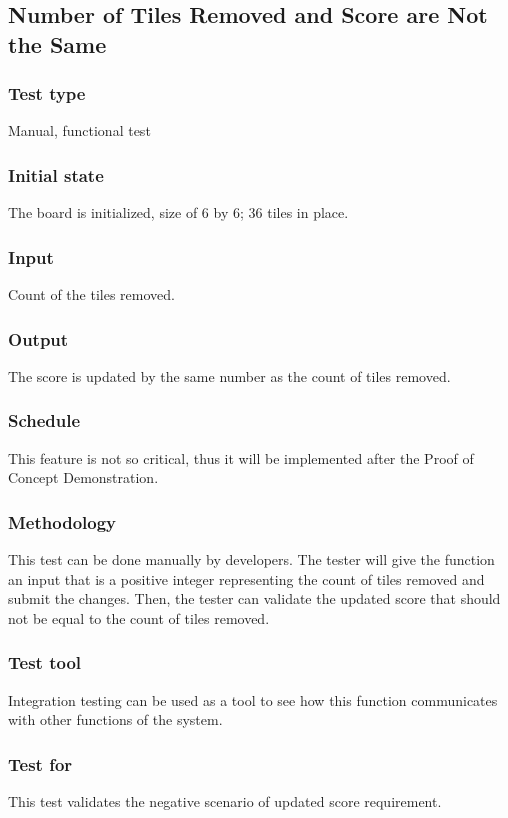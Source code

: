 \documentclass[12pt]{article}
\begin{document}
\newpage

\subsection{Number of Tiles Removed and Score are Not the Same}
\subsubsection{Test type}
Manual, functional test
\subsubsection{Initial state}
The board is initialized, size of 6 by 6; 36 tiles in place.
\subsubsection{Input}
Count of the tiles removed.
\subsubsection{Output}
The score is updated by the same number as the count of tiles removed.
\subsubsection{Schedule}
This feature is not so critical, thus it will be implemented after the Proof of Concept Demonstration.
\subsubsection{Methodology}
This test can be done manually by developers. The tester will give the function an input that is a positive integer representing the count of tiles removed and submit the changes. Then, the tester can validate the updated score that should not be equal to the count of tiles removed.
\subsubsection{Test tool}
Integration testing can be used as a tool to see how this function communicates with other functions of the system.
\subsubsection{Test for}
This test validates the negative scenario of updated score requirement.
\end{document}
